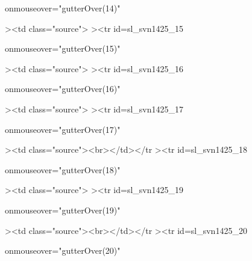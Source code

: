  onmouseover="gutterOver(14)"

><td class="source">%
><tr
id=sl_svn1425_15

 onmouseover="gutterOver(15)"

><td class="source">%
><tr
id=sl_svn1425_16

 onmouseover="gutterOver(16)"

><td class="source">%
><tr
id=sl_svn1425_17

 onmouseover="gutterOver(17)"

><td class="source"><br></td></tr
><tr
id=sl_svn1425_18

 onmouseover="gutterOver(18)"

><td class="source">%
><tr
id=sl_svn1425_19

 onmouseover="gutterOver(19)"

><td class="source">\thispagestyle{empty}<br></td></tr
><tr
id=sl_svn1425_20

 onmouseover="gutterOver(20)"


